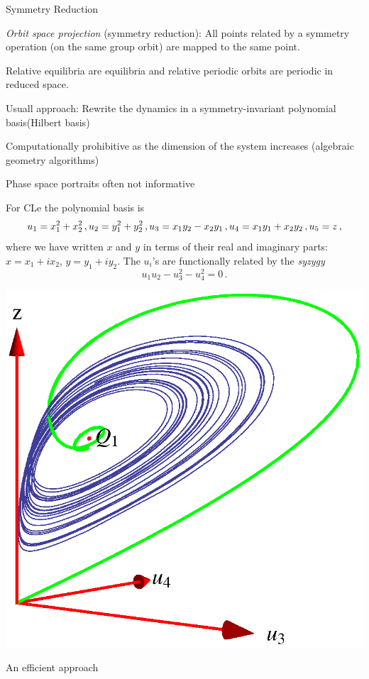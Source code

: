 \documentclass{theo1poster}[2003/04/25]
\renewcommand{\labelitemi}{\ding{228}}
\renewenvironment{itemize}%
 {\begin{list}{\labelitemi}%
       {%
        \setlength{\leftmargin}{0pt}%
        \setlength{\itemindent}{0pt}%
        \settowidth{\labelwidth}{\labelitemi}%
        \addtolength{\labelsep}{\itemindent}
        \addtolength{\leftmargin}{\labelwidth}%
        \addtolength{\leftmargin}{\labelsep}%
        \addtolength{\leftmargin}{-\itemindent}%
       }%
 }
 {\end{list}}
\begin{document}
\begin{poster}{3}
\begin{sheet}{\CLe}
\begin{itemize}
\end{itemize}
 
\end{sheet}




\begin{sheet}{Symmetry Reduction}

\large
\begin{itemize}
 \item  \emph{Orbit space projection} (symmetry reduction): All points related by a symmetry
	operation (on the same group orbit) are mapped to the same point.
 \item Relative equilibria are equilibria and relative periodic orbits are periodic in reduced space. 
 \item Usuall approach: Rewrite the dynamics in a symmetry-invariant polynomial basis(Hilbert basis)
	\begin{itemize}
 		\item Computationally prohibitive as the dimension of the system increases (algebraic geometry algorithms)
		\item Phase space portraits often not informative
		\item For CLe the polynomial basis is
		\[
			u_1 = x_1^2+x_2^2 \,, \\
			u_2 = y_1^2+y_2^2 \,, \\
			u_3 = x_1 y_2-x_2 y_1\,, \\
			u_4 = x_1 y_1+x_2 y_2\,, \\
			u_5 = z\,,
		\]
	where we have written $x$ and $y$ in terms of their real and imaginary parts: $x=x_1+i x_2$, $y=y_1+i y_2$. The $u_i$'s are functionally related by the \emph{syzygy}
	\[
 		u_1 u_2 -u_3^2-u_4^2 =0\,.
	\]
	\end{itemize}
\end{itemize}

	\includegraphics[width=.38\textwidth]{../../figs/CLEip1.eps}


\end{sheet}


\begin{sheet}{An efficient approach}


\end{sheet}
\end{poster}
\end{document}
